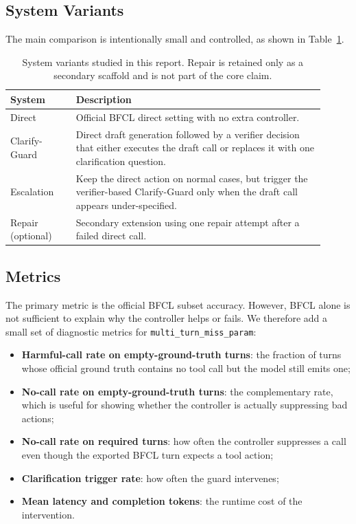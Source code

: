 \documentclass[10pt,twocolumn]{article}
\begin{document}
\subsection{System Variants}
The main comparison is intentionally small and controlled, as shown in Table~\ref{tab:systems}.

\begin{table}[t]
\centering
\small
\begin{tabular}{p{0.19\linewidth}p{0.72\linewidth}}
\toprule
System & Description \\
\midrule
Direct & Official BFCL direct setting with no extra controller. \\
Clarify-Guard & Direct draft generation followed by a verifier decision that either executes the draft call or replaces it with one clarification question. \\
Escalation & Keep the direct action on normal cases, but trigger the verifier-based Clarify-Guard only when the draft call appears under-specified. \\
Repair (optional) & Secondary extension using one repair attempt after a failed direct call. \\
\bottomrule
\end{tabular}
\caption{System variants studied in this report. Repair is retained only as a secondary scaffold and is not part of the core claim.}
\label{tab:systems}
\end{table}

\subsection{Metrics}
The primary metric is the official BFCL subset accuracy. However, BFCL alone is not sufficient to explain why the controller helps or fails. We therefore add a small set of diagnostic metrics for \texttt{multi\_turn\_miss\_param}:
\begin{itemize}
    \item \textbf{Harmful-call rate on empty-ground-truth turns}: the fraction of turns whose official ground truth contains no tool call but the model still emits one;
    \item \textbf{No-call rate on empty-ground-truth turns}: the complementary rate, which is useful for showing whether the controller is actually suppressing bad actions;
    \item \textbf{No-call rate on required turns}: how often the controller suppresses a call even though the exported BFCL turn expects a tool action;
    \item \textbf{Clarification trigger rate}: how often the guard intervenes;
    \item \textbf{Mean latency and completion tokens}: the runtime cost of the intervention.
\end{itemize}
\end{document}
